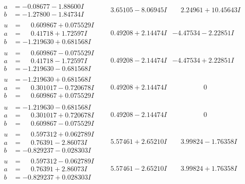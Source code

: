 \documentclass[1p]{elsarticle_modified}
\theoremstyle{definition}
\begin{document}
$$\begin{array}{c|c|c}
\begin{aligned}
a &= -0.08677 - 1.88600 I \\
b &= -1.27800 - 1.84734 I\end{aligned}
 & \phantom{-}3.65105 - 8.06945 I & \phantom{-}2.24961 + 10.45643 I \\ \hline\begin{aligned}
u &= \phantom{-}0.609867 + 0.075529 I \\
a &= \phantom{-}0.41718 + 1.72597 I \\
b &= -1.219630 + 0.681568 I\end{aligned}
 & \phantom{-}0.49208 + 2.14474 I & -4.47534 - 2.22851 I \\ \hline\begin{aligned}
u &= \phantom{-}0.609867 - 0.075529 I \\
a &= \phantom{-}0.41718 - 1.72597 I \\
b &= -1.219630 - 0.681568 I\end{aligned}
 & \phantom{-}0.49208 - 2.14474 I & -4.47534 + 2.22851 I \\ \hline\begin{aligned}
u &= -1.219630 + 0.681568 I \\
a &= \phantom{-}0.301017 - 0.720678 I \\
b &= \phantom{-}0.609867 + 0.075529 I\end{aligned}
 & \phantom{-}0.49208 + 2.14474 I & \phantom{-0.000000 } 0 \\ \hline\begin{aligned}
u &= -1.219630 - 0.681568 I \\
a &= \phantom{-}0.301017 + 0.720678 I \\
b &= \phantom{-}0.609867 - 0.075529 I\end{aligned}
 & \phantom{-}0.49208 - 2.14474 I & \phantom{-0.000000 } 0 \\ \hline\begin{aligned}
u &= \phantom{-}0.597312 + 0.062789 I \\
a &= \phantom{-}0.76391 - 2.86073 I \\
b &= -0.829237 - 0.028303 I\end{aligned}
 & \phantom{-}5.57461 + 2.65210 I & \phantom{-}3.99824 - 1.76358 I \\ \hline\begin{aligned}
u &= \phantom{-}0.597312 - 0.062789 I \\
a &= \phantom{-}0.76391 + 2.86073 I \\
b &= -0.829237 + 0.028303 I\end{aligned}
 & \phantom{-}5.57461 - 2.65210 I & \phantom{-}3.99824 + 1.76358 I\\

\end{array}$$
\end{document}
